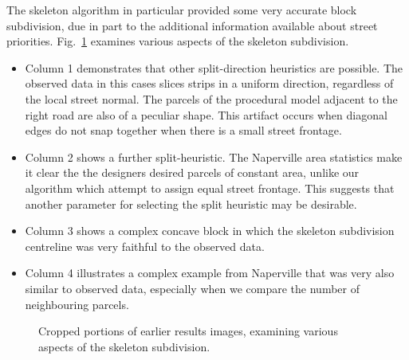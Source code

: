\newpage
\FloatBarrier

The skeleton algorithm in particular provided some very accurate block subdivision, due in part to the additional information available about street priorities. Fig.~\ref{fig:parcelEval3} examines various aspects of the skeleton subdivision.
\begin{itemize}
\item Column 1 demonstrates that other split-direction heuristics are possible. The observed data in this cases slices strips in a uniform direction, regardless of the local street normal. The parcels of the procedural model adjacent to the right road are also of a peculiar shape. This artifact occurs when diagonal edges do not snap together when there is a small street frontage. 
\item Column 2 shows a further split-heuristic. The Naperville area statistics make it clear the the designers desired parcels of constant area, unlike our algorithm which attempt to assign equal street frontage. This suggests that another parameter for selecting the split heuristic may be desirable.
\item Column 3 shows a complex concave block in which the skeleton subdivision centreline was very faithful to the observed data.  
\item Column 4 illustrates a complex example from Naperville that was very also similar to observed data, especially when we compare the number of neighbouring parcels.
\end{itemize}

\begin{figure}[hb]
\centering
\def\svgwidth{1.0\columnwidth}

\caption[Details from the skeleton subdivision]{\label{fig:parcelEval3}Cropped portions of earlier results images, examining various aspects of the skeleton subdivision.}
\end{figure}

\FloatBarrier

